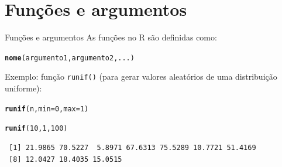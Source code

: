 \documentclass[10pt,handout]{beamer}\usepackage[]{graphicx}\usepackage[]{color}
\makeatletter
\newcommand{\hlnum}[1]{\textcolor[rgb]{0.686,0.059,0.569}{#1}}%
\newcommand{\hlstd}[1]{\textcolor[rgb]{0.345,0.345,0.345}{#1}}%
\newcommand{\hlkwc}[1]{\textcolor[rgb]{0.333,0.667,0.333}{#1}}%
\newcommand{\hlkwd}[1]{\textcolor[rgb]{0.737,0.353,0.396}{\textbf{#1}}}%
\newenvironment{kframe}{%
 \def\at@end@of@kframe{}%
 \ifinner\ifhmode%
  \def\at@end@of@kframe{\end{minipage}}%
  \begin{minipage}{\columnwidth}%
 \fi\fi%
 \def\FrameCommand##1{\hskip\@totalleftmargin \hskip-\fboxsep
 \colorbox{shadecolor}{##1}\hskip-\fboxsep
     \hskip-\linewidth \hskip-\@totalleftmargin \hskip\columnwidth}%
 \MakeFramed {\advance\hsize-\width
   \@totalleftmargin\z@ \linewidth\hsize
   \@setminipage}}%
 {\par\unskip\endMakeFramed%
 \at@end@of@kframe}
\newenvironment{knitrout}{}{} %
\makeatother
\begin{document}
\section{Funções e argumentos}

\begin{frame}[fragile]{Funções e argumentos}
As funções no R são definidas como:
\begin{knitrout}\small
{}\color{fgcolor}\begin{kframe}
\begin{alltt}
\hlkwd{nome}\hlstd{(argumento1, argumento2, ...)}
\end{alltt}
\end{kframe}
\end{knitrout}
Exemplo: função \verb|runif()| (para gerar valores aleatórios de uma
distribuição uniforme):
\begin{knitrout}\small
{}\color{fgcolor}\begin{kframe}
\begin{alltt}
\hlkwd{runif}\hlstd{(n,} \hlkwc{min} \hlstd{=} \hlnum{0}\hlstd{,} \hlkwc{max} \hlstd{=} \hlnum{1}\hlstd{)}
\end{alltt}
\end{kframe}
\end{knitrout}
\begin{knitrout}\small
{}\color{fgcolor}\begin{kframe}
\begin{alltt}
\hlkwd{runif}\hlstd{(}\hlnum{10}\hlstd{,} \hlnum{1}\hlstd{,} \hlnum{100}\hlstd{)}
\end{alltt}
\begin{verbatim}
 [1] 21.9865 70.5227  5.8971 67.6313 75.5289 10.7721 51.4169
 [8] 12.0427 18.4035 15.0515
\end{verbatim}
\end{kframe}
\end{knitrout}
\end{frame}
\end{document}
